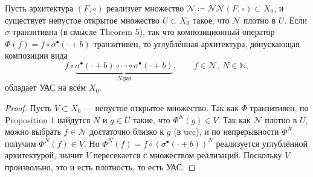 \documentclass[../NDCNNAI_main.tex]{subfiles}
\begin{document}
\begin{corollary}
Пусть архитектура $(F,\circ)$ реализует множество $\mathcal{N}\coloneq \mathcal{NN}(F,\circ)\subset X_0$,
и существует непустое открытое множество $U\subset X_0$ такое, что $\mathcal{N}$ плотно в $U$.
Если $\sigma$ транзитивна (в смысле Theorem 5), так что композиционный оператор $\Phi(f)=f\circ\sigma^\bullet(\cdot+b)$ транзитивен,
то углублённая архитектура, допускающая композиции вида
\[
f\circ \underbrace{\sigma^\bullet(\cdot+b)\circ \cdots \circ \sigma^\bullet(\cdot+b)}_{N\ \text{раз}},
\qquad f\in\mathcal{N},\ N\in\mathbb{N},
\]
обладает УАС на всём $X_0$.    
\end{corollary}
\begin{proof}
Пусть $V\subset X_0$ --- непустое открытое множество. Так как $\Phi$ транзитивен, по Proposition 1 найдутся
$N$ и $g\in U$ такие, что $\Phi^N(g)\in V$.
Так как $\mathcal{N}$ плотно в $U$, можно выбрать $f\in \mathcal{N}$ достаточно близко к $g$ (в ucc),
и по непрерывности $\Phi^N$ получим $\Phi^N(f)\in V$.
Но $\Phi^N(f)=f\circ(\sigma^\bullet(\cdot+b))^N$ реализуется углублённой архитектурой, значит $V$ пересекается
с множеством реализаций. Поскольку $V$ произвольно, это и есть плотность, то есть УАС.
\end{proof}
\end{document}
